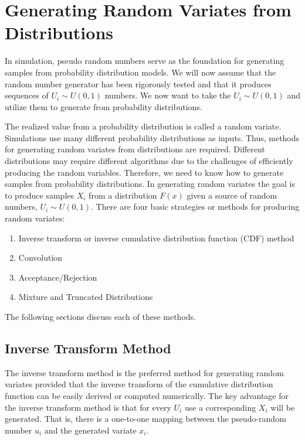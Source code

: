 \documentclass[
]{book}
\providecommand{\tightlist}{%
  \setlength{\itemsep}{0pt}\setlength{\parskip}{0pt}}
\theoremstyle{definition}
\theoremstyle{definition}
\theoremstyle{definition}
\theoremstyle{definition}
\theoremstyle{remark}
\begin{document}
\hypertarget{app:rnrv:rvs}{%
\section{Generating Random Variates from Distributions}\label{app:rnrv:rvs}}

In simulation, pseudo random numbers serve as the foundation for
generating samples from probability distribution models. We will now
assume that the random number generator has been rigorously tested and
that it produces sequences of \(U_{i} \sim U(0,1)\) numbers. We now want
to take the \(U_{i} \sim U(0,1)\) and utilize them to generate from
probability distributions.

The realized value from a probability distribution is called a random
variate. Simulations use many different probability distributions as
inputs. Thus, methods for generating random variates from distributions
are required. Different distributions may require different algorithms due to the challenges of efficiently producing the random variables. Therefore, we need to know how to generate samples from probability distributions. In generating random variates the goal is to produce samples \(X_{i}\) from a distribution \(F(x)\) given a source of random
numbers, \(U_{i} \sim U(0,1)\). There are four basic strategies or methods
for producing random variates:

\begin{enumerate}
\def\labelenumi{\arabic{enumi}.}
\tightlist
\item
  Inverse transform or inverse cumulative distribution function (CDF) method
\item
  Convolution
\item
  Acceptance/Rejection
\item
  Mixture and Truncated Distributions
\end{enumerate}

The following sections discuss each of these methods.

\hypertarget{inverse-transform-method}{%
\subsection{Inverse Transform Method}\label{inverse-transform-method}}

The inverse transform method is the preferred method for generating
random variates provided that the inverse transform of the cumulative
distribution function can be easily derived or computed numerically. The
key advantage for the inverse transform method is that for every \(U_{i}\)
use a corresponding \(X_{i}\) will be generated. That is, there is a one-to-one mapping between the pseudo-random number \(u_i\) and the generated variate \(x_i\).
\end{document}
